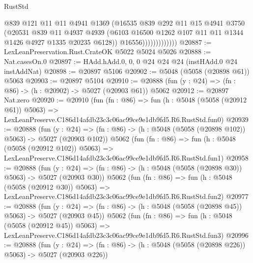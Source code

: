 \begin{lexlean}{RustStd}
\begin{coremodule}
                            @839
                            @121
                            @11
                            @11
                            @4941
                            @1369
                            (@16535
                              @839
                              @292
                              @11
                              @15
                              @4941
                              @3750
                              (@20531
                                @839
                                @11
                                @4937
                                @4939
                                (@6103
                                  @16500
                                  @1262
                                  @107
                                  @11
                                  @11
                                  @1344
                                  @1426
                                  @4927
                                  @1335
                                  @20235
                                  @6128))
                              @16556)))))))))))))
@20887 := LexLeanPreservation.Rust.CrateOK @5022 @5024 @5026
@20888 := Nat.casesOn.{0}
@20897 := HAdd.hAdd.{0, 0, 0} @24 @24 @24 (instHAdd.{0} @24 instAddNat)
@20898 := @20897 @5106
@20902 := @5048 (@5058 (@20898 @61)) @5063
@20903 := @20897 @5104
@20910 := @20888 (fun (y : @24) => (fn : @86) -> (h : @20902) -> @5027 (@20903 @61)) @5062
@20912 := @20897 Nat.zero
@20920 := @20910
    (fun (fn : @86) =>
    fun (h : @5048 (@5058 (@20912 @61)) @5063) =>
    LexLeanPreserve.C186d14afdb23c3c06ac99ce9e1db9fd5.R6.RustStd.fun0)
@20939 := @20888
    (fun (y : @24) => (fn : @86) -> (h : @5048 (@5058 (@20898 @102)) @5063) -> @5027 (@20903 @102))
    @5062
    (fun (fn : @86) =>
    fun (h : @5048 (@5058 (@20912 @102)) @5063) =>
    LexLeanPreserve.C186d14afdb23c3c06ac99ce9e1db9fd5.R6.RustStd.fun1)
@20958 := @20888
    (fun (y : @24) => (fn : @86) -> (h : @5048 (@5058 (@20898 @30)) @5063) -> @5027 (@20903 @30))
    @5062
    (fun (fn : @86) =>
    fun (h : @5048 (@5058 (@20912 @30)) @5063) =>
    LexLeanPreserve.C186d14afdb23c3c06ac99ce9e1db9fd5.R6.RustStd.fun2)
@20977 := @20888
    (fun (y : @24) => (fn : @86) -> (h : @5048 (@5058 (@20898 @45)) @5063) -> @5027 (@20903 @45))
    @5062
    (fun (fn : @86) =>
    fun (h : @5048 (@5058 (@20912 @45)) @5063) =>
    LexLeanPreserve.C186d14afdb23c3c06ac99ce9e1db9fd5.R6.RustStd.fun3)
@20996 := @20888
    (fun (y : @24) => (fn : @86) -> (h : @5048 (@5058 (@20898 @226)) @5063) -> @5027 (@20903 @226))

\end{coremodule}
\end{lexlean}
